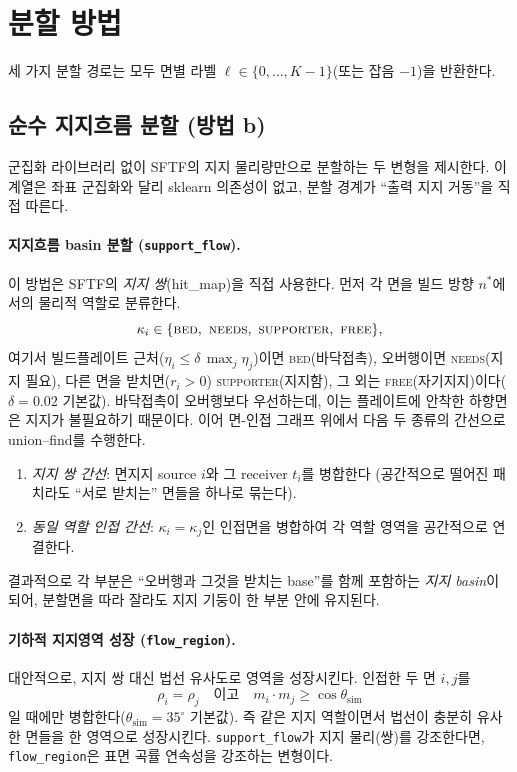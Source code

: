 \documentclass[11pt,a4paper]{article}
\begin{document}
\section{분할 방법}

세 가지 분할 경로는 모두 면별 라벨 $\ell\in\{0,\dots,K-1\}$(또는 잡음 $-1$)을 반환한다.

\subsection{순수 지지흐름 분할 (방법 b)}
\label{sec:flowregion}

군집화 라이브러리 없이 SFTF의 지지 물리량만으로 분할하는 두 변형을 제시한다.
이 계열은 좌표 군집화와 달리 sklearn 의존성이 없고,
분할 경계가 ``출력 지지 거동''을 직접 따른다.

\paragraph{지지흐름 basin 분할 (\texttt{support\_flow}).}
이 방법은 SFTF의 \emph{지지 쌍}(hit\_map)을 직접 사용한다.
먼저 각 면을 빌드 방향 $n^\ast$에서의 물리적 역할로 분류한다.
\begin{equation}
\kappa_i\in\{\textsc{bed},\ \textsc{needs},\ \textsc{supporter},\ \textsc{free}\},
\end{equation}
여기서 빌드플레이트 근처($\eta_i\le \delta\,\max_j\eta_j$)이면 \textsc{bed}(바닥접촉),
오버행이면 \textsc{needs}(지지 필요),
다른 면을 받치면($r_i>0$) \textsc{supporter}(지지함),
그 외는 \textsc{free}(자기지지)이다($\delta=0.02$ 기본값).
바닥접촉이 오버행보다 우선하는데, 이는 플레이트에 안착한 하향면은 지지가 불필요하기 때문이다.
이어 면-인접 그래프 위에서 다음 두 종류의 간선으로 union--find를 수행한다.
\begin{enumerate}
\item \emph{지지 쌍 간선}: 면지지 source $i$와 그 receiver $t_i$를 병합한다
(공간적으로 떨어진 패치라도 ``서로 받치는'' 면들을 하나로 묶는다).
\item \emph{동일 역할 인접 간선}: $\kappa_i=\kappa_j$인 인접면을 병합하여
각 역할 영역을 공간적으로 연결한다.
\end{enumerate}
결과적으로 각 부분은 ``오버행과 그것을 받치는 base''를 함께 포함하는
\emph{지지 basin}이 되어, 분할면을 따라 잘라도 지지 기둥이 한 부분 안에 유지된다.

\paragraph{기하적 지지영역 성장 (\texttt{flow\_region}).}
대안적으로, 지지 쌍 대신 법선 유사도로 영역을 성장시킨다.
인접한 두 면 $i,j$를
\begin{equation}
\rho_i=\rho_j \quad\text{이고}\quad m_i\cdot m_j \ge \cos\theta_{\mathrm{sim}}
\end{equation}
일 때에만 병합한다($\theta_{\mathrm{sim}}=35^\circ$ 기본값).
즉 같은 지지 역할이면서 법선이 충분히 유사한 면들을 한 영역으로 성장시킨다.
\texttt{support\_flow}가 지지 물리(쌍)를 강조한다면,
\texttt{flow\_region}은 표면 곡률 연속성을 강조하는 변형이다.
\end{document}
